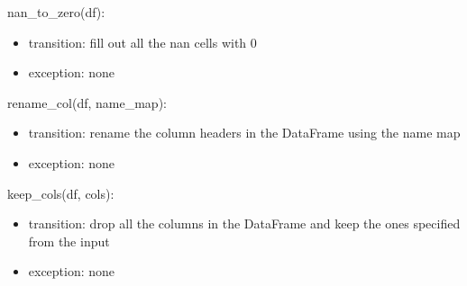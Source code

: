 \documentclass[12pt]{article}
\begin{document}
\noindent nan\_to\_zero(df):
\begin{itemize}
    \item transition: fill out all the nan cells with $0$
    \item exception: none
\end{itemize}

\noindent rename\_col(df, name\_map):
\begin{itemize}
    \item transition: rename the column headers in the DataFrame using the name map
    \item exception: none
\end{itemize}

\noindent keep\_cols(df, cols):
\begin{itemize}
    \item transition: drop all the columns in the DataFrame and keep the ones specified from the input
    \item exception: none
\end{itemize}




\end{document}
